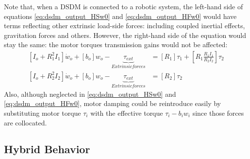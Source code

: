 %
Note that, when a DSDM is connected to a robotic system, the left-hand side of equations \eqref{eq:dsdm_output_HSw0} and \eqref{eq:dsdm_output_HFw0} would have terms reflecting other extrinsic load-side forces: including coupled inertial effects, gravitation forces and others. However, the right-hand side of the equation would stay the same: the motor torques transmission gains would not be affected: 
%
\begin{align}
\left[ I_o + R_1^2 I_1 \right] \dot{w}_o +  \left[ b_o \right] w_o - \underbrace{\tau_{ext}}_{Extrinsic forces}  &= \left[ R_1 \right] \tau_1 + \left[ R_1 \frac{R_1 I_1}{R_2 I_2} \right] \tau_2 
\label{eq:dsdm_output_HSw02} \\
\left[ I_o + R_2^2 I_2 \right] \dot{w}_o +  \left[ b_o \right] w_o - \underbrace{\tau_{ext}}_{Extrinsic forces} &= \left[ R_2 \right] \tau_2 
\label{eq:dsdm_output_HFw02}
\end{align}
%
Also, although neglected in \eqref{eq:dsdm_output_HSw0} and \eqref{eq:dsdm_output_HFw0}, motor damping could be reintroduce easily by substituting motor torque $\tau_i$ with the effective torque $\tau_i - b_i w_i$ since those forces are collocated. 

\newpage
\subsection{Hybrid Behavior}

